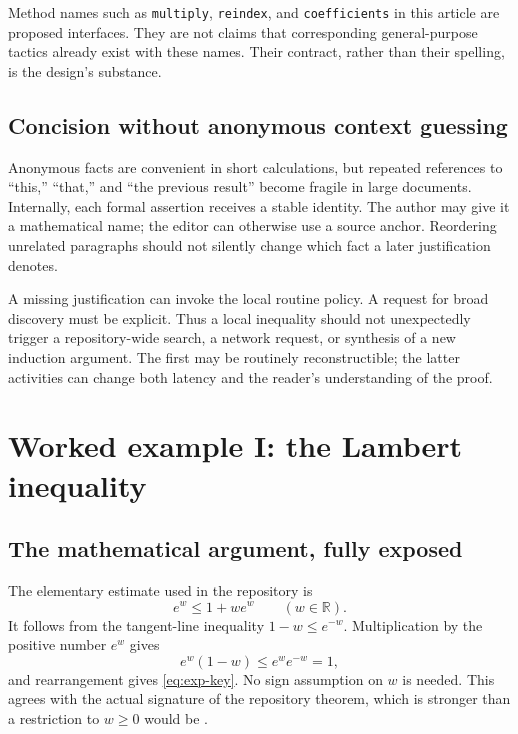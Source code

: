 \documentclass[11pt,a4paper]{article}
\newcommand{\RR}{\mathbb R}
\newcommand{\codeid}[1]{\nolinkurl{#1}}
\begin{document}
Method names such as \codeid{multiply}, \codeid{reindex}, and \codeid{coefficients} in this article are proposed interfaces. They are not claims that corresponding general-purpose tactics already exist with these names. Their contract, rather than their spelling, is the design's substance.

\subsection{Concision without anonymous context guessing}

Anonymous facts are convenient in short calculations, but repeated references to ``this,'' ``that,'' and ``the previous result'' become fragile in large documents. Internally, each formal assertion receives a stable identity. The author may give it a mathematical name; the editor can otherwise use a source anchor. Reordering unrelated paragraphs should not silently change which fact a later justification denotes.

A missing justification can invoke the local routine policy. A request for broad discovery must be explicit. Thus a local inequality should not unexpectedly trigger a repository-wide search, a network request, or synthesis of a new induction argument. The first may be routinely reconstructible; the latter activities can change both latency and the reader's understanding of the proof.

\section{Worked example I: the Lambert inequality}
\label{sec:lambert}

\subsection{The mathematical argument, fully exposed}

The elementary estimate used in the repository is
\begin{equation}
 e^w\le 1+w e^w \qquad(w\in\RR).
 \label{eq:exp-key}
\end{equation}
It follows from the tangent-line inequality $1-w\le e^{-w}$. Multiplication by the positive number $e^w$ gives
\[
 e^w(1-w)\le e^we^{-w}=1,
\]
and rearrangement gives \eqref{eq:exp-key}. No sign assumption on $w$ is needed. This agrees with the actual signature of the repository theorem, which is stronger than a restriction to $w\ge0$ would be \cite{srclambert}.
\end{document}
